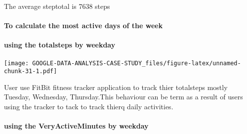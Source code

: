 \documentclass[
]{article}
\newenvironment{Shaded}{\begin{snugshade}}{\end{snugshade}}
\newcommand{\AttributeTok}[1]{\textcolor[rgb]{0.77,0.63,0.00}{#1}}
\newcommand{\CommentTok}[1]{\textcolor[rgb]{0.56,0.35,0.01}{\textit{#1}}}
\newcommand{\FunctionTok}[1]{\textcolor[rgb]{0.00,0.00,0.00}{#1}}
\newcommand{\NormalTok}[1]{#1}
\newcommand{\OtherTok}[1]{\textcolor[rgb]{0.56,0.35,0.01}{#1}}
\newcommand{\SpecialCharTok}[1]{\textcolor[rgb]{0.00,0.00,0.00}{#1}}
\newcommand{\StringTok}[1]{\textcolor[rgb]{0.31,0.60,0.02}{#1}}
\begin{document}
The average steptotal is 7638 steps

\hypertarget{to-calculate-the-most-active-days-of-the-week}{%
\paragraph{To calculate the most active days of the
week}\label{to-calculate-the-most-active-days-of-the-week}}

\hypertarget{using-the-totalsteps-by-weekday}{%
\paragraph{using the totalsteps by
weekday}\label{using-the-totalsteps-by-weekday}}

\begin{Shaded}
\end{Shaded}

\texttt{[image: GOOGLE-DATA-ANALYSIS-CASE-STUDY\_files/figure-latex/unnamed-chunk-31-1.pdf]}

User use FitBit fitness tracker application to track thier totalsteps
mostly Tuesday, Wednesday, Thursday.This behaviour can be term as a
result of users using the tracker to tack to track thierq daily
activities.

\hypertarget{using-the-veryactiveminutes-by-weekday}{%
\paragraph{using the VeryActiveMinutes by
weekday}\label{using-the-veryactiveminutes-by-weekday}}
\end{document}
